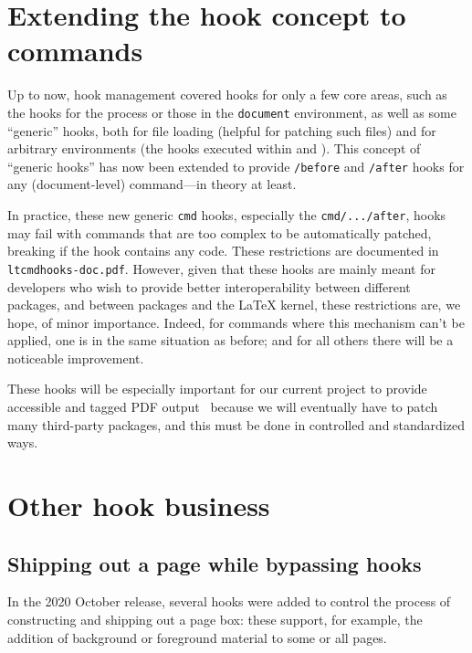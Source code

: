 \documentclass{ltnews}
\providecommand\hook[1]{\texttt{#1}}
\providecommand\env[1]{\texttt{#1}}
\providecommand\env[1]{\texttt{#1}}
\begin{document}
\section{Extending the hook concept to commands}

Up to now, hook management covered hooks for only a few core areas,
such as the hooks for the  process or those in the
\env{document} environment, as well as some \enquote {generic} hooks,
both for file loading (helpful for patching such files) and for
arbitrary environments (the hooks executed within  and
).  This concept of \enquote{generic hooks} has now been
extended to provide \hook{/before} and \hook{/after} hooks for any
(document-level) command---in theory at least.


In practice, these new generic \hook{cmd} hooks, especially the
\hook{cmd/.../after}, hooks may fail with commands that are too
complex to be automatically patched, breaking if the hook contains any
code.  These restrictions are documented in
\texttt{ltcmdhooks-doc.pdf}.
%   
However, given that these hooks are mainly meant for developers who
wish to provide better interoperability between different packages,
and between packages and the \LaTeX{} kernel, these restrictions are,
we hope, of minor importance.  Indeed, for commands where this
mechanism can't be applied, one is in the same situation as before;
and for all others there will be a noticeable improvement.

These hooks will be especially important for our current project to
provide accessible and tagged PDF output~\cite{33:blueprint} because
we will eventually have to patch many third-party packages, and this
must be done in controlled and standardized ways.




\section{Other hook business}


\subsection{Shipping out a page while bypassing hooks}

In the 2020 October release, several hooks were added to control the
process of constructing and shipping out a page box: these support,
for example, the addition of background or foreground material 
to some or all pages.
\end{document}

